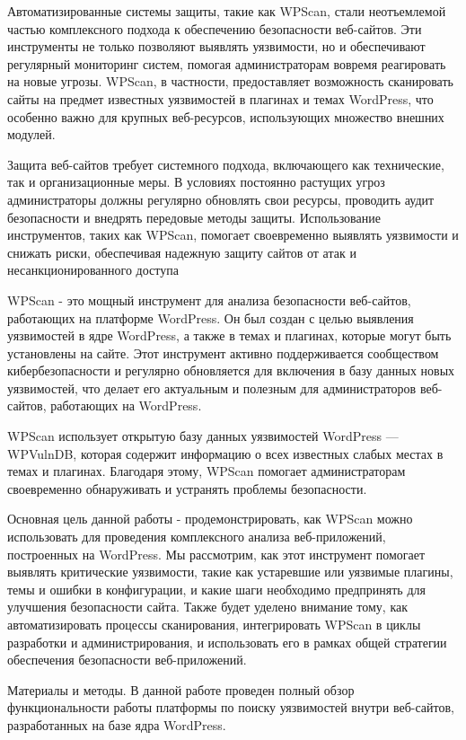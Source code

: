 Автоматизированные системы защиты, такие как WPScan, стали неотъемлемой
частью комплексного подхода к обеспечению безопасности веб-сайтов. Эти
инструменты не только позволяют выявлять уязвимости, но и обеспечивают
регулярный мониторинг систем, помогая администраторам вовремя
реагировать на новые угрозы. WPScan, в частности, предоставляет
возможность сканировать сайты на предмет известных уязвимостей в
плагинах и темах WordPress, что особенно важно для крупных веб-ресурсов,
использующих множество внешних модулей.

Защита веб-сайтов требует системного подхода, включающего как
технические, так и организационные меры. В условиях постоянно растущих
угроз администраторы должны регулярно обновлять свои ресурсы, проводить
аудит безопасности и внедрять передовые методы защиты. Использование
инструментов, таких как WPScan, помогает своевременно выявлять
уязвимости и снижать риски, обеспечивая надежную защиту сайтов от атак и
несанкционированного доступа

WPScan - это мощный инструмент для анализа безопасности веб-сайтов,
работающих на платформе WordPress. Он был создан с целью выявления
уязвимостей в ядре WordPress, а также в темах и плагинах, которые могут
быть установлены на сайте. Этот инструмент активно поддерживается
сообществом кибербезопасности и регулярно обновляется для включения в
базу данных новых уязвимостей, что делает его актуальным и полезным для
администраторов веб-сайтов, работающих на WordPress.

WPScan использует открытую базу данных уязвимостей WordPress ---
WPVulnDB, которая содержит информацию о всех известных слабых местах в
темах и плагинах. Благодаря этому, WPScan помогает администраторам
своевременно обнаруживать и устранять проблемы безопасности.

Основная цель данной работы - продемонстрировать, как WPScan можно
использовать для проведения комплексного анализа веб-приложений,
построенных на WordPress. Мы рассмотрим, как этот инструмент помогает
выявлять критические уязвимости, такие как устаревшие или уязвимые
плагины, темы и ошибки в конфигурации, и какие шаги необходимо
предпринять для улучшения безопасности сайта. Также будет уделено
внимание тому, как автоматизировать процессы сканирования, интегрировать
WPScan в циклы разработки и администрирования, и использовать его в
рамках общей стратегии обеспечения безопасности веб-приложений.

Материалы и методы. В данной работе проведен полный обзор
функциональности работы платформы по поиску уязвимостей внутри
веб-сайтов, разработанных на базе ядра WordPress.

